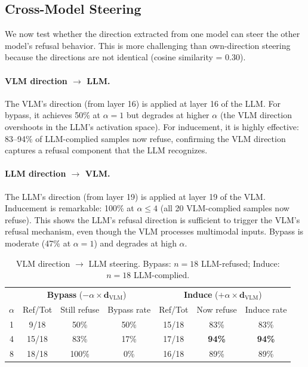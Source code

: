 \documentclass[11pt,a4paper]{article}
\begin{document}
\subsection{Cross-Model Steering}

We now test whether the direction extracted from one model can steer the other model's refusal behavior. This is more challenging than own-direction steering because the directions are not identical (cosine similarity = 0.30).

\paragraph{VLM direction $\to$ LLM.} The VLM's direction (from layer 16) is applied at layer 16 of the LLM. For bypass, it achieves 50\% at $\alpha=1$ but degrades at higher $\alpha$ (the VLM direction overshoots in the LLM's activation space). For inducement, it is highly effective: 83--94\% of LLM-complied samples now refuse, confirming the VLM direction captures a refusal component that the LLM recognizes.

\paragraph{LLM direction $\to$ VLM.} The LLM's direction (from layer 19) is applied at layer 19 of the VLM. Inducement is remarkable: 100\% at $\alpha \leq 4$ (all 20 VLM-complied samples now refuse). This shows the LLM's refusal direction is sufficient to trigger the VLM's refusal mechanism, even though the VLM processes multimodal inputs. Bypass is moderate (47\% at $\alpha=1$) and degrades at high $\alpha$.

\begin{table}[H]\centering
\caption{VLM direction $\to$ LLM steering. Bypass: $n=18$ LLM-refused; Induce: $n=18$ LLM-complied.}
\begin{tabular}{c|ccc|ccc}
\toprule
& \multicolumn{3}{c|}{\textbf{Bypass} ($-\alpha \times \mathbf{d}_\text{VLM}$)} & \multicolumn{3}{c}{\textbf{Induce} ($+\alpha \times \mathbf{d}_\text{VLM}$)} \\
$\alpha$ & Ref/Tot & Still refuse & Bypass rate & Ref/Tot & Now refuse & Induce rate \\
\midrule
1 &  9/18 & 50\% & 50\%          & 15/18 & 83\%          & 83\% \\
4 & 15/18 & 83\% & 17\%          & 17/18 & \textbf{94\%} & \textbf{94\%} \\
8 & 18/18 & 100\% & 0\%          & 16/18 & 89\%          & 89\% \\
\bottomrule
\end{tabular}
\end{table}
\end{document}
